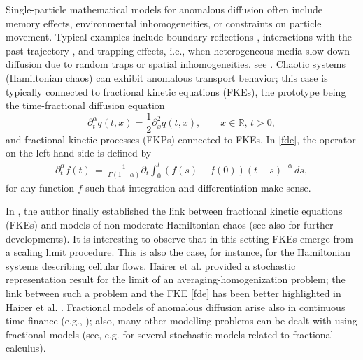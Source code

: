 \documentclass[reqno]{amsart}
\theoremstyle{remark}
\numberwithin{equation}{section} %
\newcommand{\1}{\mathds{1}}
\begin{document}
	Single-particle mathematical models for anomalous diffusion often include memory effects, environmental inhomogeneities, or constraints on particle movement. Typical examples include boundary reflections \cite{burdzy2015reflections, mijatovicreflection}, interactions with the past trajectory \cite{amit1983asymptotic, toth1995true, toth2012superdiffusive}, and trapping effects, i.e., when heterogeneous media slow down diffusion due to random traps or spatial inhomogeneities. see \cite{arous2006dynamics, benarous}. Chaotic systems (Hamiltonian chaos) can exhibit anomalous transport behavior; this case is typically connected to fractional kinetic equations (FKEs), the prototype being the time-fractional diffusion equation 
	\begin{equation}
		\partial_t^\alpha q(t,x)=\frac{1}{2}\partial_x^2q(t,x), \qquad x \in \mathbb{R},\, t>0,
		\label{fde}
	\end{equation}
	and fractional kinetic processes (FKPs) connected to FKEs. In \eqref{fde}, the operator on the left-hand side is defined by
	\begin{align}
		\partial_t^\alpha f(t) \, = \, \frac{1}{\Gamma(1-\alpha)} \partial_t \int_0^t (f(s)-f(0)) (t-s)^{-\alpha} \, ds,
	\end{align}
	for any function $f$ such that integration and differentiation make sense.
	
	In \cite{zaslavsky3}, the author finally established the link between fractional kinetic equations (FKEs) and models of non-moderate Hamiltonian chaos (see also \cite{zaslavsky4, zaslavsky5} for further developments). It is interesting to observe that in this setting FKEs emerge from a scaling limit procedure. This is also the case, for instance, for the Hamiltonian systems describing cellular flows. Hairer et al. \cite{hairer1} provided a stochastic representation result for the limit of an averaging-homogenization problem; the link between such a problem and the FKE \eqref{fde} has been better highlighted in Hairer et al. \cite{hairer2}. Fractional models of anomalous diffusion arise also in continuous time finance (e.g., \cite{scalas2000fractional, mainardi2000fractional, gorenflo2001fractional}); also, many other modelling problems can be dealt with using fractional models (see, e.g. \cite{baleanu2012fractional, meerschaert2019stochastic} for several stochastic models related to fractional calculus).
	
\end{document}
